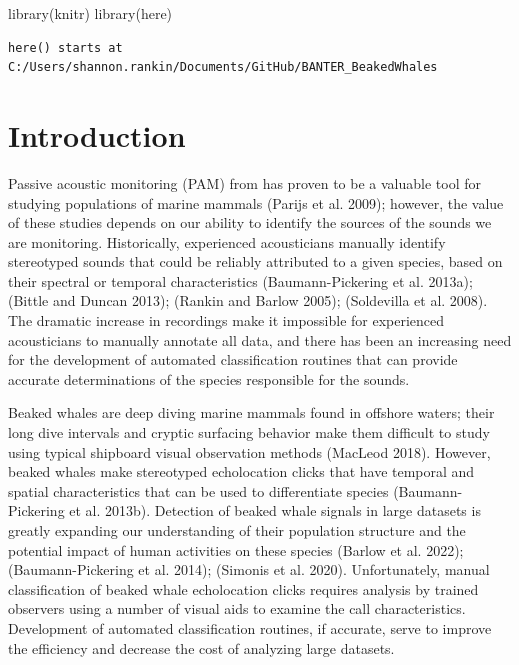 \documentclass[
  letterpaper,
  DIV=11,
  numbers=noendperiod]{scrartcl}
\newenvironment{Shaded}{\begin{snugshade}}{\end{snugshade}}
\newcommand{\FunctionTok}[1]{\textcolor[rgb]{0.28,0.35,0.67}{#1}}
\newcommand{\NormalTok}[1]{\textcolor[rgb]{0.00,0.23,0.31}{#1}}
\begin{document}
\begin{Shaded}
\begin{Highlighting}[]
\FunctionTok{library}\NormalTok{(knitr)}
\FunctionTok{library}\NormalTok{(here)}
\end{Highlighting}
\end{Shaded}

\begin{verbatim}
here() starts at C:/Users/shannon.rankin/Documents/GitHub/BANTER_BeakedWhales
\end{verbatim}

\hypertarget{introduction}{%
\section{Introduction}\label{introduction}}

Passive acoustic monitoring (PAM) from has proven to be a valuable tool
for studying populations of marine mammals (Parijs et al. 2009);
however, the value of these studies depends on our ability to identify
the sources of the sounds we are monitoring. Historically, experienced
acousticians manually identify stereotyped sounds that could be reliably
attributed to a given species, based on their spectral or temporal
characteristics (Baumann-Pickering et al. 2013a); (Bittle and Duncan
2013); (Rankin and Barlow 2005); (Soldevilla et al. 2008). The dramatic
increase in recordings make it impossible for experienced acousticians
to manually annotate all data, and there has been an increasing need for
the development of automated classification routines that can provide
accurate determinations of the species responsible for the sounds.

Beaked whales are deep diving marine mammals found in offshore waters;
their long dive intervals and cryptic surfacing behavior make them
difficult to study using typical shipboard visual observation methods
(MacLeod 2018). However, beaked whales make stereotyped echolocation
clicks that have temporal and spatial characteristics that can be used
to differentiate species (Baumann-Pickering et al. 2013b). Detection of
beaked whale signals in large datasets is greatly expanding our
understanding of their population structure and the potential impact of
human activities on these species (Barlow et al. 2022);
(Baumann-Pickering et al. 2014); (Simonis et al. 2020). Unfortunately,
manual classification of beaked whale echolocation clicks requires
analysis by trained observers using a number of visual aids to examine
the call characteristics. Development of automated classification
routines, if accurate, serve to improve the efficiency and decrease the
cost of analyzing large datasets.
\end{document}
